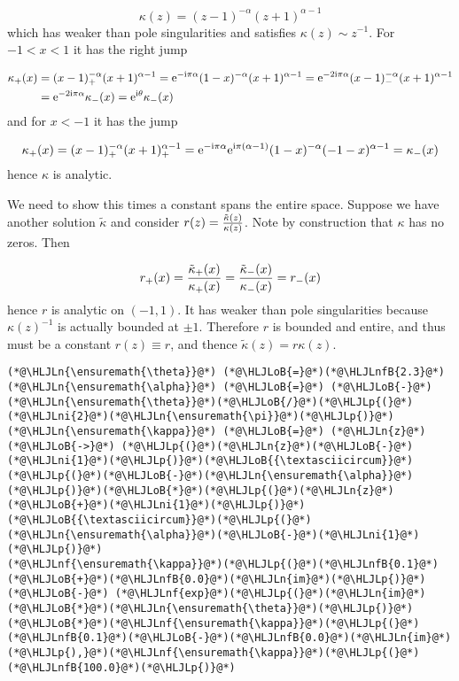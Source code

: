 \documentclass[12pt,a4paper]{article}
\newcommand{\HLJLn}[1]{#1}
\newcommand{\HLJLnf}[1]{\textcolor[RGB]{66,102,213}{#1}}
\newcommand{\HLJLnfB}[1]{\textcolor[RGB]{59,151,46}{#1}}
\newcommand{\HLJLni}[1]{\textcolor[RGB]{59,151,46}{#1}}
\newcommand{\HLJLoB}[1]{\textcolor[RGB]{102,102,102}{\textbf{#1}}}
\newcommand{\HLJLp}[1]{#1}
\def\I{ {\rm i} }
\def\E{ {\rm e} }
\begin{document}
\[
\kappa(z) = (z-1)^{-\alpha} (z+1)^{\alpha-1}
\]
which has weaker than pole singularities and satisfies $\kappa(z) \sim z^{-1}$. For $-1 < x < 1$ it has the right jump


\begin{align*}
\kappa_+(x) &= (x-1)_+^{-\alpha} (x+1)^{\alpha - 1}  = \E^{-\I \pi \alpha} (1-x)^{-\alpha} (x+1)^{\alpha-1} = \E^{-2\I \pi \alpha} (x-1)_-^{-\alpha} (x+1)^{\alpha-1} \\
&= \E^{-2 \I \pi \alpha} \kappa_-(x)= \E^{\I \theta} \kappa_-(x)
\end{align*}
and  for $x < -1$ it has the jump

\[
\kappa_+(x) = (x-1)_+^{-\alpha} (x+1)_+^{\alpha-1}  = \E^{-\I \pi \alpha}\E^{\I \pi (\alpha-1)} (1-x)^{-\alpha} (-1-x)^{\alpha-1} =  \kappa_-(x)
\]
hence $\kappa$ is analytic.

We need to show this times a constant spans the entire space. Suppose we have another solution $\tilde \kappa$ and consider $r(z) = {\tilde \kappa(z) \over \kappa(z)}$. Note by construction that $\kappa$ has no zeros. Then

\[
r_+(x) = {\tilde\kappa_+(x) \over \kappa_+(x)} = {\tilde\kappa_-(x) \over \kappa_-(x)} = r_-(x)
\]
hence $r$ is analytic on $(-1,1)$. It has weaker than pole singularities because $\kappa(z)^{-1}$ is actually bounded at $\pm 1$. Therefore $r$ is bounded and entire, and thus must be a constant $r(z) \equiv r$, and thence $\tilde \kappa(z) = r \kappa(z)$.


\begin{lstlisting}
(*@\HLJLn{\ensuremath{\theta}}@*) (*@\HLJLoB{=}@*)(*@\HLJLnfB{2.3}@*)
(*@\HLJLn{\ensuremath{\alpha}}@*) (*@\HLJLoB{=}@*) (*@\HLJLoB{-}@*)(*@\HLJLn{\ensuremath{\theta}}@*)(*@\HLJLoB{/}@*)(*@\HLJLp{(}@*)(*@\HLJLni{2}@*)(*@\HLJLn{\ensuremath{\pi}}@*)(*@\HLJLp{)}@*)
(*@\HLJLn{\ensuremath{\kappa}}@*) (*@\HLJLoB{=}@*) (*@\HLJLn{z}@*) (*@\HLJLoB{->}@*) (*@\HLJLp{(}@*)(*@\HLJLn{z}@*)(*@\HLJLoB{-}@*)(*@\HLJLni{1}@*)(*@\HLJLp{)}@*)(*@\HLJLoB{{\textasciicircum}}@*)(*@\HLJLp{(}@*)(*@\HLJLoB{-}@*)(*@\HLJLn{\ensuremath{\alpha}}@*)(*@\HLJLp{)}@*)(*@\HLJLoB{*}@*)(*@\HLJLp{(}@*)(*@\HLJLn{z}@*)(*@\HLJLoB{+}@*)(*@\HLJLni{1}@*)(*@\HLJLp{)}@*)(*@\HLJLoB{{\textasciicircum}}@*)(*@\HLJLp{(}@*)(*@\HLJLn{\ensuremath{\alpha}}@*)(*@\HLJLoB{-}@*)(*@\HLJLni{1}@*)(*@\HLJLp{)}@*)
(*@\HLJLnf{\ensuremath{\kappa}}@*)(*@\HLJLp{(}@*)(*@\HLJLnfB{0.1}@*)(*@\HLJLoB{+}@*)(*@\HLJLnfB{0.0}@*)(*@\HLJLn{im}@*)(*@\HLJLp{)}@*) (*@\HLJLoB{-}@*) (*@\HLJLnf{exp}@*)(*@\HLJLp{(}@*)(*@\HLJLn{im}@*)(*@\HLJLoB{*}@*)(*@\HLJLn{\ensuremath{\theta}}@*)(*@\HLJLp{)}@*)(*@\HLJLoB{*}@*)(*@\HLJLnf{\ensuremath{\kappa}}@*)(*@\HLJLp{(}@*)(*@\HLJLnfB{0.1}@*)(*@\HLJLoB{-}@*)(*@\HLJLnfB{0.0}@*)(*@\HLJLn{im}@*)(*@\HLJLp{),}@*)(*@\HLJLnf{\ensuremath{\kappa}}@*)(*@\HLJLp{(}@*)(*@\HLJLnfB{100.0}@*)(*@\HLJLp{)}@*)
\end{lstlisting}
\end{document}
